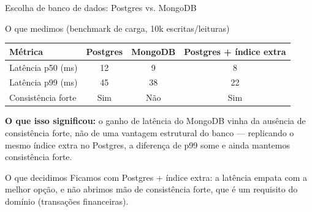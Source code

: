 
\begin{frame}{Escolha de banco de dados: Postgres vs. MongoDB}
  \begin{numerobloco}{O que medimos (benchmark de carga, 10k escritas/leituras)}
    \begin{center}
    \begin{tabular}{lccc}
      \toprule
      \textbf{Métrica} & \textbf{Postgres} & \textbf{MongoDB} & \textbf{Postgres + índice extra} \\
      \midrule
      Latência p50 (ms) & 12   & 9    & 8    \\
      Latência p99 (ms) & 45   & 38   & \alert{22}    \\
      Consistência forte & Sim  & Não  & Sim  \\
      \bottomrule
    \end{tabular}
    \end{center}
  \end{numerobloco}

  \pause
  \textbf{O que isso significou:} o ganho de latência do MongoDB vinha da ausência de
  consistência forte, não de uma vantagem estrutural do banco — replicando o mesmo índice
  extra no Postgres, a diferença de p99 \alert{some} e ainda mantemos consistência forte.

  \pause
  \begin{decisaobloco}{O que decidimos}
    Ficamos com Postgres + índice extra: a latência empata com a melhor opção, e não abrimos
    mão de consistência forte, que é um requisito do domínio (transações financeiras).
  \end{decisaobloco}
\end{frame}
